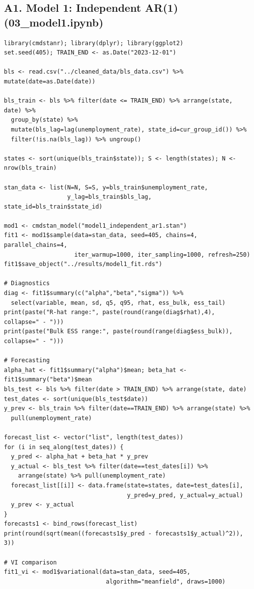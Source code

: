 \documentclass[10pt]{article}
\begin{document}
\subsection*{A1. Model 1: Independent AR(1) (03\_model1.ipynb)}
{\scriptsize
\begin{verbatim}
library(cmdstanr); library(dplyr); library(ggplot2)
set.seed(405); TRAIN_END <- as.Date("2023-12-01")

bls <- read.csv("../cleaned_data/bls_data.csv") %>% mutate(date=as.Date(date))

bls_train <- bls %>% filter(date <= TRAIN_END) %>% arrange(state, date) %>%
  group_by(state) %>%
  mutate(bls_lag=lag(unemployment_rate), state_id=cur_group_id()) %>%
  filter(!is.na(bls_lag)) %>% ungroup()

states <- sort(unique(bls_train$state)); S <- length(states); N <- nrow(bls_train)

stan_data <- list(N=N, S=S, y=bls_train$unemployment_rate,
                  y_lag=bls_train$bls_lag, state_id=bls_train$state_id)

mod1 <- cmdstan_model("model1_independent_ar1.stan")
fit1 <- mod1$sample(data=stan_data, seed=405, chains=4, parallel_chains=4,
                    iter_warmup=1000, iter_sampling=1000, refresh=250)
fit1$save_object("../results/model1_fit.rds")

# Diagnostics
diag <- fit1$summary(c("alpha","beta","sigma")) %>%
  select(variable, mean, sd, q5, q95, rhat, ess_bulk, ess_tail)
print(paste("R-hat range:", paste(round(range(diag$rhat),4), collapse=" - ")))
print(paste("Bulk ESS range:", paste(round(range(diag$ess_bulk)), collapse=" - ")))

# Forecasting
alpha_hat <- fit1$summary("alpha")$mean; beta_hat <- fit1$summary("beta")$mean
bls_test <- bls %>% filter(date > TRAIN_END) %>% arrange(state, date)
test_dates <- sort(unique(bls_test$date))
y_prev <- bls_train %>% filter(date==TRAIN_END) %>% arrange(state) %>%
  pull(unemployment_rate)

forecast_list <- vector("list", length(test_dates))
for (i in seq_along(test_dates)) {
  y_pred <- alpha_hat + beta_hat * y_prev
  y_actual <- bls_test %>% filter(date==test_dates[i]) %>%
    arrange(state) %>% pull(unemployment_rate)
  forecast_list[[i]] <- data.frame(state=states, date=test_dates[i],
                                   y_pred=y_pred, y_actual=y_actual)
  y_prev <- y_actual
}
forecasts1 <- bind_rows(forecast_list)
print(round(sqrt(mean((forecasts1$y_pred - forecasts1$y_actual)^2)), 3))

# VI comparison
fit1_vi <- mod1$variational(data=stan_data, seed=405,
                             algorithm="meanfield", draws=1000)
\end{verbatim}
}
\end{document}
